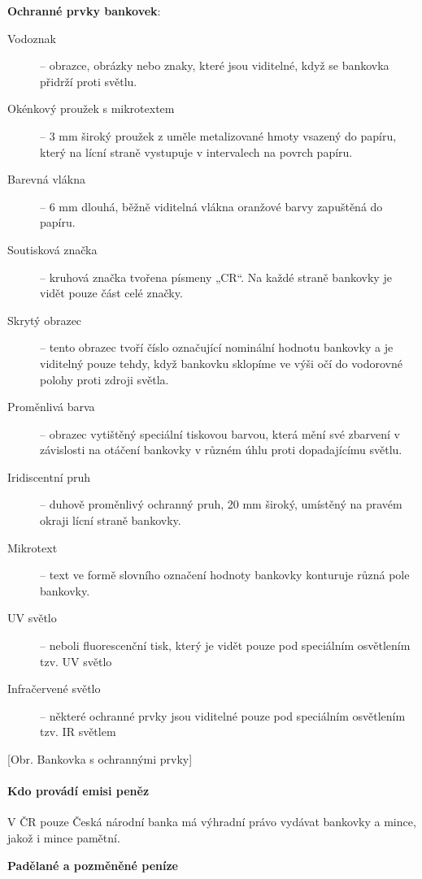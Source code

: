 \textbf{Ochranné prvky bankovek}:
\begin{description}
    \item[Vodoznak] -- obrazce, obrázky nebo znaky, které jsou viditelné, když se bankovka přidrží proti světlu.
    \item[Okénkový proužek s mikrotextem] -- 3 mm široký proužek z uměle metalizované hmoty vsazený do papíru, který na lícní straně vystupuje v intervalech na povrch papíru.
    \item[Barevná vlákna] -- 6 mm dlouhá, běžně viditelná vlákna oranžové barvy zapuštěná do papíru.
    \item[Soutisková značka] -- kruhová značka tvořena písmeny „CR“. Na každé straně bankovky je vidět pouze část celé značky.
    \item[Skrytý obrazec] -- tento obrazec tvoří číslo označující nominální hodnotu bankovky a je viditelný pouze tehdy, když bankovku sklopíme ve výši očí do vodorovné polohy proti zdroji světla.
    \item[Proměnlivá barva] -- obrazec vytištěný speciální tiskovou barvou, která mění své zbarvení v závislosti na otáčení bankovky v různém úhlu proti dopadajícímu světlu.
    \item[Iridiscentní pruh] -- duhově proměnlivý ochranný pruh, 20 mm široký, umístěný na pravém okraji lícní straně bankovky.
    \item[Mikrotext] -- text ve formě slovního označení hodnoty bankovky konturuje různá pole bankovky.
    \item[UV světlo] -- neboli fluorescenční tisk, který je vidět pouze pod speciálním osvětlením tzv. UV světlo
    \item[Infračervené světlo] -- některé ochranné prvky jsou viditelné pouze pod speciálním osvětlením tzv. IR světlem
\end{description}

[Obr. Bankovka s ochrannými prvky]

\paragraph{Kdo provádí emisi peněz}
V ČR pouze Česká národní banka má výhradní právo vydávat bankovky a mince, jakož i mince pamětní.

\textbf{Padělané a pozměněné peníze}

